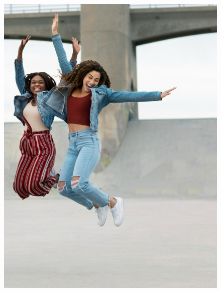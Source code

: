 \begin{figure}[htpb]
\vspace*{-2.5cm}
\hspace{-3cm}\includegraphics[height=\paperheight]{../separadores/separadorEF9B.png}
\end{figure}

 \setcounter{chapter}{0}
 



